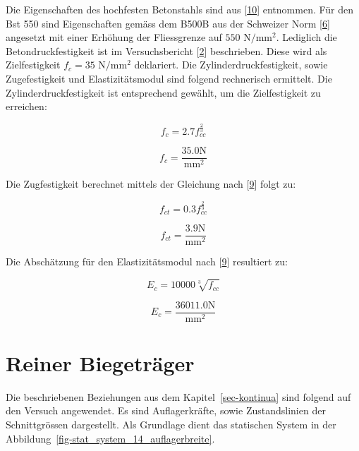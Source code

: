 \documentclass[
  12pt,
  letterpaper,
  egregdoesnotlikesansseriftitles]{scrreprt}
\begin{document}
Die Eigenschaften des hochfesten Betonstahls sind aus
{[}\protect\hyperlink{ref-annahutte_broschure}{10}{]} entnommen. Für den
Bst 550 sind Eigenschaften gemäss dem B500B aus der Schweizer Norm
{[}\protect\hyperlink{ref-SIA2013a}{6}{]} angesetzt mit einer Erhöhung
der Fliessgrenze auf \(550 \text{ N}/\text{mm}^2\). Lediglich die
Betondruckfestigkeit ist im Versuchsbericht
{[}\protect\hyperlink{ref-Tue2019}{2}{]} beschrieben. Diese wird als
Zielfestigkeit \(f_c = 35 \text{ N}/\text{mm}^2\) deklariert. Die
Zylinderdruckfestigkeit, sowie Zugefestigkeit und Elastizitätsmodul sind
folgend rechnerisch ermittelt. Die Zylinderdruckfestigkeit ist
entsprechend gewählt, um die Zielfestigkeit zu erreichen:

\begin{equation}f_{c} = 2.7 f_{cc}^{\frac{2}{3}}\end{equation}

\begin{equation}f_{c} = \frac{35.0 \text{N}}{\text{mm}^{2}}\end{equation}

Die Zugfestigkeit berechnet mittels der Gleichung nach
{[}\protect\hyperlink{ref-Jaeger2013}{9}{]} folgt zu:

\begin{equation}f_{ct} = 0.3 f_{cc}^{\frac{2}{3}}\end{equation}

\begin{equation}f_{ct} = \frac{3.9 \text{N}}{\text{mm}^{2}}\end{equation}

Die Abschätzung für den Elastizitätsmodul nach
{[}\protect\hyperlink{ref-Jaeger2013}{9}{]} resultiert zu:

\begin{equation}E_{c} = 10000 \sqrt[3]{f_{cc}}\end{equation}

\begin{equation}E_{c} = \frac{36011.0 \text{N}}{\text{mm}^{2}}\end{equation}

\hypertarget{reiner-biegetruxe4ger-1}{%
\section{Reiner Biegeträger}\label{reiner-biegetruxe4ger-1}}

Die beschriebenen Beziehungen aus dem Kapitel~\ref{sec-kontinua} sind
folgend auf den Versuch angewendet. Es sind Auflagerkräfte, sowie
Zustandslinien der Schnittgrössen dargestellt. Als Grundlage dient das
statischen System in der
Abbildung~\ref{fig-stat_system_14_auflagerbreite}.
\end{document}
